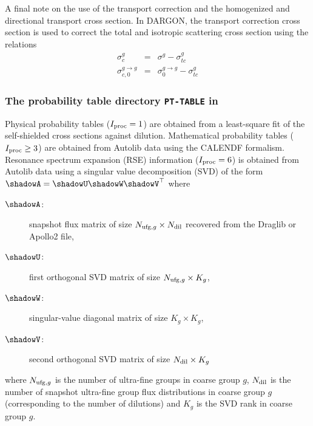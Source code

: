 \vskip 0.15cm

A final note on the use of the transport correction and the homogenized and
directional transport cross section. In DARGON, the transport correction cross
section is used to correct the total and isotropic scattering cross
section using the relations
\begin{eqnarray*}
\sigma_{c}^{g}       &=& \sigma^{g}         -\sigma_{tc}^{g}\\
\sigma_{c,0}^{g\to g}&=& \sigma_{0}^{g\to g}-\sigma_{tc}^{g}
\end{eqnarray*}

\goodbreak

\subsubsection{The probability table directory {\tt PT-TABLE} in }\label{sect:pt-table}

Physical probability tables ($I_{\rm proc}=1$) are obtained from a least-square fit of the
self-shielded cross sections against dilution. Mathematical probability tables ($I_{\rm proc}\ge 3$) are obtained from
Autolib data using the CALENDF formalism.
Resonance spectrum expansion (RSE) information ($I_{\rm proc}=6$) is obtained from Autolib data using a singular value decomposition (SVD) of the
form $\shadowA=\shadowU \shadowW \shadowV^\top$ where
\begin{description}
\item[$\shadowA$:] snapshot flux matrix of size $N_{{\rm ufg},g}\times N_{\rm dil}$ recovered from the Draglib or Apollo2 file,
\item[$\shadowU$:] first orthogonal SVD matrix of size $N_{{\rm ufg},g}\times K_g$,
\item[$\shadowW$:] singular-value diagonal matrix of size $K_g\times K_g$,
\item[$\shadowV$:] second orthogonal SVD matrix of size $N_{\rm dil}\times K_g$
\end{description}
\noindent where $N_{{\rm ufg},g}$ is the number of ultra-fine groups in coarse group $g$, $N_{\rm dil}$ is the number of snapshot ultra-fine group
flux distributions in coarse group $g$ (corresponding to the number of dilutions) and $K_g$ is the SVD rank in coarse group $g$.

